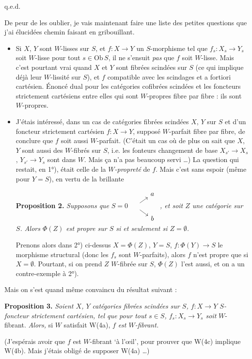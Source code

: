 \documentclass[11pt]{article}
\newcommand{\printedpage}[1]{\marginpar{\footnotesize p.~#1}}
\newcommand{\msp}[1]{\marginpar{\footnotesize [#1]}}
\begin{document}
\hfill q.e.d.

De peur de les oublier, je vais maintenant faire une liste des petites questions que j'ai élucidées chemin faisant en gribouillant.

\begin{itemize}[leftmargin=5em,labelsep=0.5em]
\item[1°)] Si $X$, $Y$ sont $W$-lisses sur $S$, et $f : X \longrightarrow Y$ un $S$-morphisme tel que $f_s : X_s \longrightarrow Y_s$ soit $W$-lisse pour tout $s \in \mathrm{Ob}\,S$, il ne s'ensuit \textit{pas} que $f$ soit $W$-lisse. Mais c'est pourtant vrai quand $X$ et $Y$ sont fibrées scindées sur $S$ (ce
\printedpage{42}
\msp{page 57}
qui implique déjà leur $W$-lissité sur $S$), et $f$ compatible avec les scindages et a fortiori cartésien. Énoncé dual pour les catégories cofibrées scindées et les foncteurs strictement cartésiens entre elles qui sont $W$-propres fibre par fibre : ils sont $W$-propres.

\item[2°)] J'étais intéressé, dans un cas de catégories fibrées scindées $X$, $Y$ sur $S$ et d'un foncteur strictement cartésien $f : X \longrightarrow Y$, supposé $W$-parfait fibre par fibre, de conclure que $f$ soit aussi $W$-parfait. (C'était un cas où de plus on sait que $X$, $Y$ sont aussi des $W$-fibrés sur $S$, i.e. les fonteurs changement de base $X_{s'} \longrightarrow X_s$, $Y_{s'} \longrightarrow Y_s$ sont dans $W$. Mais ça n'a pas beaucoup servi \dots) La question qui restait, en 1°), était celle de la $W$\textit{-propreté} de $f$. Mais c'est sans espoir (même pour $Y = S$), en vertu de la brillante %

\textbf{Proposition 2.} \textit{Supposons que} $S = 0$
$\begin{tikzcd}[ampersand replacement=\&, row sep=tiny, column sep=small, baseline=(Z.base)]
\& a \\
|[alias=Z]| \phantom{0} \arrow[ur] \arrow[dr] \& \\
\& b
\end{tikzcd}$
\textit{, et soit $Z$ une catégorie sur $S$. Alors $\Phi(Z)$ est propre sur $S$ si et seulement si $Z = \emptyset$.}

Prenons alors dans 2°) ci-dessus $X = \Phi(Z)$, $Y = S$, $f : \Phi(Y) \longrightarrow S$ le morphisme structural (donc les $f_s$ sont $W$-parfaits), alors $f$ n'est propre que si $X = \emptyset$. Pourtant, si on prend $Z$ $W$-fibrée sur $S$, $\Phi(Z)$ l'est aussi, et on a un contre-exemple à 2°).
\end{itemize}

Mais on s'est quand même convaincu du résultat suivant :

\textbf{Proposition 3.} \textit{Soient $X$, $Y$ catégories fibrées scindées sur $S$, $f : X \longrightarrow Y$ $S$-foncteur strictement cartésien, tel que}
\msp{page 58}
\textit{pour tout $s \in S$, $f_s : X_s \longrightarrow Y_s$ soit} $W$-fibrant. \textit{Alors,} si $W$ satisfait W(4a), $f$ \textit{est $W$-fibrant.}

(J'espérais avoir que $f$ est $W$-fibrant `à l'\oe{}il', pour prouver que W(4c) implique W(4b). Mais j'étais obligé de supposer W(4a) \dots)
\end{document}
